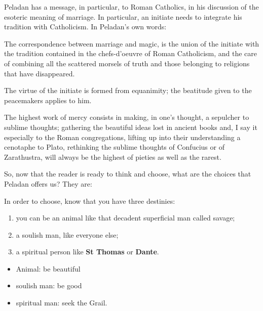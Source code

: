 Peladan has a message, in particular, to Roman Catholics, in his discussion of the esoteric meaning of marriage. In particular, an initiate needs to integrate his tradition with Catholicism. In Peladan's own words:

\begin{quotationx}
The correspondence between marriage and magic, is the union of the initiate with the tradition contained in the chefs-d'oeuvre of Roman Catholicism, and the care of combining all the scattered morsels of truth and those belonging to religions that have disappeared.

The virtue of the initiate is formed from equanimity; the beatitude given to the peacemakers applies to him.

The highest work of mercy consists in making, in one's thought, a sepulcher to sublime thoughts; gathering the beautiful ideas lost in ancient books and, I say it especially to the Roman congregations, lifting up into their understanding a cenotaphe to Plato, rethinking the sublime thoughts of Confucius or of Zarathustra, will always be the highest of pieties as well as the rarest.
\end{quotationx}


So, now that the reader is ready to think and choose, what are the choices that Peladan offers us? They are:

\begin{quotex}
In order to choose, know that you have three destinies:

\begin{enumerate}
\item you can be an animal like that decadent superficial man called savage;

\item a soulish man, like everyone else;

\item a spiritual person like \textbf{St Thomas} or \textbf{Dante}.
\end{enumerate}

\begin{itemize}


\item Animal: be beautiful

\item soulish man: be good

\item spiritual man: seek the Grail.
\end{itemize}
\end{quotex}


